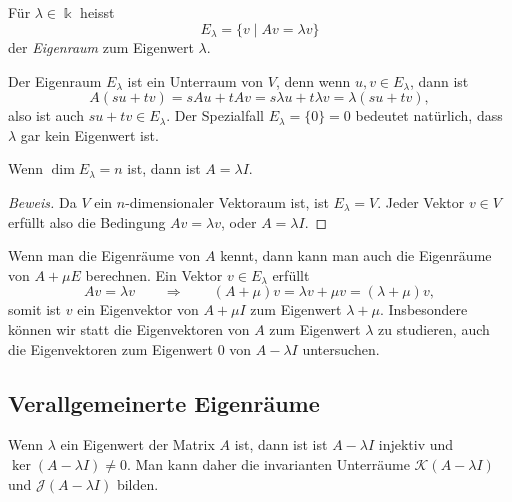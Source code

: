 \begin{definition}
Für $\lambda\in\Bbbk$ heisst
\[
E_\lambda
=
\{ v\;|\; Av=\lambda v\}
\]
der {\em Eigenraum} zum Eigenwert $\lambda$.
%
%
\end{definition}

Der Eigenraum $E_\lambda$ ist ein Unterraum von $V$, denn wenn
$u,v\in E_\lambda$, dann ist
\[
A(su+tv)
=
sAu+tAv
=
s\lambda u + t\lambda v
=
\lambda(su+tv),
\]
also ist auch $su+tv\in E_\lambda$.
Der Spezialfall $E_\lambda = \{0\}=0$ bedeutet natürlich, dass $\lambda$ gar kein
Eigenwert ist.

\begin{satz}
Wenn $\dim E_\lambda=n$ ist, dann ist $A=\lambda I$.
\end{satz}

\begin{proof}[Beweis]
Da $V$ ein $n$-dimensionaler Vektoraum ist, ist $E_\lambda=V$.
Jeder Vektor $v\in V$ erfüllt also die Bedingung $Av=\lambda v$,
oder $A=\lambda I$.
\end{proof}

Wenn man die Eigenräume von $A$ kennt, dann kann man auch die Eigenräume
von $A+\mu E$ berechnen.
Ein Vektor $v\in E_\lambda$ erfüllt
\[
Av=\lambda v
\qquad\Rightarrow\qquad
(A+\mu)v = \lambda v + \mu v
=
(\lambda+\mu)v,
\]
somit ist $v$ ein Eigenvektor von $A+\mu I$ zum Eigenwert $\lambda+\mu$.
Insbesondere können wir statt die Eigenvektoren von $A$ zum Eigenwert $\lambda$
zu studieren, auch die Eigenvektoren zum Eigenwert $0$ von $A-\lambda I$
untersuchen.

%
%
\subsection{Verallgemeinerte Eigenräume
\label{buch:subsection:verallgemeinerte-eigenraeume}}
Wenn $\lambda$ ein Eigenwert der Matrix $A$ ist, dann ist
ist $A-\lambda I$ injektiv und $\ker(A-\lambda I)\ne 0$.
Man kann daher die invarianten Unterräume $\mathcal{K}(A-\lambda I)$
und $\mathcal{J}(A-\lambda I)$ bilden.

